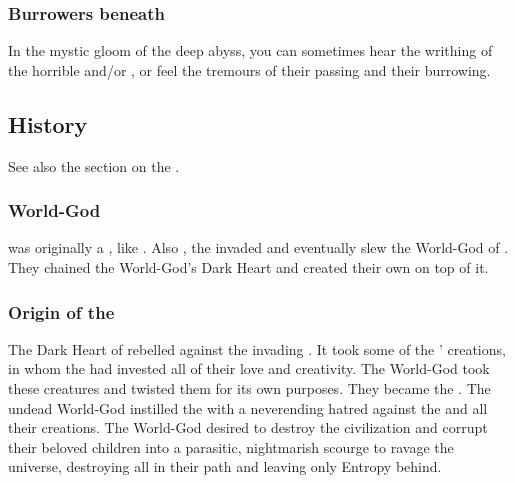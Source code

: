 \subsubsection{Burrowers beneath}
In the mystic gloom of the deep abyss, you can sometimes hear the writhing of the horrible  and/or , or feel the tremours of their passing and their burrowing.









\subsection{History}
See also the section on the . 





\subsubsection{World-God}
\Erebos was originally a , like \Miith.
Also , the \voyagers invaded and eventually slew the World-God of \Erebos.
They chained the World-God's Dark Heart and created their own \dweomer on top of it.





\subsubsection{Origin of the \banes}
The Dark Heart of \Erebos rebelled against the invading \voyagers.
It took some of the \voyagers' creations, in whom the \voyagers{} had invested all of their love and creativity.
The World-God took these creatures and twisted them for its own purposes.
They became the \banes. 
The undead World-God instilled the \banes with a neverending hatred against the \voyagers and all their creations. 
The World-God desired to destroy the \psp{\voyagers} civilization and corrupt their beloved children into a parasitic, nightmarish scourge to ravage the universe, destroying all in their path and leaving only Entropy behind. 

